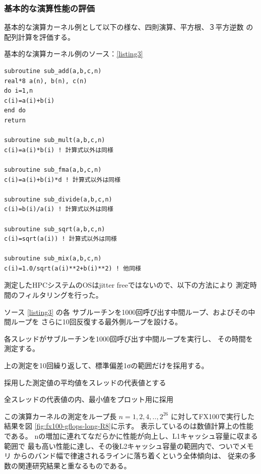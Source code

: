 \documentclass[submit,techrep,noauthor]{ipsj}
\begin{document}
\subsubsection{基本的な演算性能の評価}

基本的な演算カーネル例として以下の様な、四則演算、平方根、３平方逆数
の配列計算を評価する。

基本的な演算カーネル例のソース：\lstlistingname \ref{listing3}

\begin{lstlisting}[caption={\hfill},label={listing3},captionpos=t]
subroutine sub_add(a,b,c,n)
real*8 a(n), b(n), c(n)  
do i=1,n
c(i)=a(i)+b(i)
end do
return

subroutine sub_mult(a,b,c,n)
c(i)=a(i)*b(i) ! 計算式以外は同様

subroutine sub_fma(a,b,c,n)
c(i)=a(i)+b(i)*d ! 計算式以外は同様

subroutine sub_divide(a,b,c,n)
c(i)=b(i)/a(i) ! 計算式以外は同様

subroutine sub_sqrt(a,b,c,n)
c(i)=sqrt(a(i)) ! 計算式以外は同様

subroutine sub_mix(a,b,c,n)
c(i)=1.0/sqrt(a(i)**2+b(i)**2) ! 他同様

\end{lstlisting}

測定したHPCシステムのOSはjitter freeではないので、以下の方法により
測定時間のフィルタリングを行った。

ソース \lstlistingname \ref{listing3} の各
サブルーチンを1000回呼び出す中間ループ、およびその中間ループを
さらに10回反復する最外側ループを設ける。
\begin{itemize}
{
\item {各スレッドがサブルーチンを1000回呼び出す中間ループを実行し、
		その時間を測定する。}
\item {上の測定を10回繰り返して、標準偏差1σの範囲だけを採用する。}
\item {採用した測定値の平均値をスレッドの代表値とする}
\item {全スレッドの代表値の内、最小値をプロット用に採用}
}
\end{itemize}


この演算カーネルの測定をループ長
\begin{math}
n=1,2,4,..,2^{26}
\end{math}
に対してFX100で実行した結果を図 \ref{fig:fx100-gflops-long-R8}に示す。
表示しているのは数値計算上の性能である。
nの増加に連れてなだらかに性能が向上し、L1キャッシュ容量に収まる範囲で
最も高い性能に達し、その後L2キャッシュ容量の範囲内で、ついでメモリ
からのバンド幅で律速されるラインに落ち着くという全体傾向は、
従来の多数の関連研究結果と重なるものである。
\end{document}
